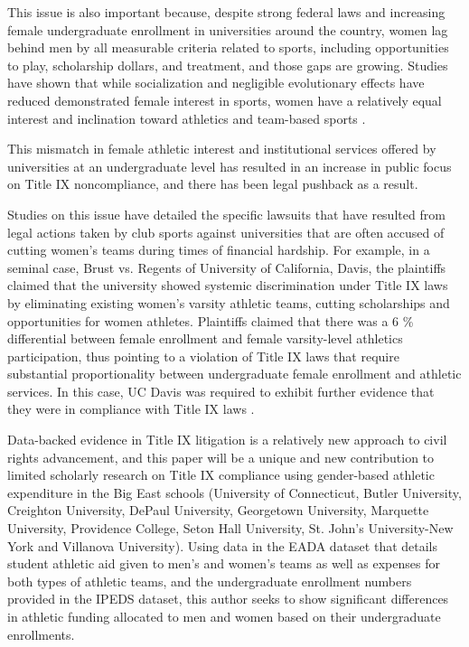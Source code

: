 \documentclass[11pt]{article}
\begin{document}
This issue is also important because, despite strong federal laws and increasing female undergraduate enrollment in universities around the country, women lag behind men by all measurable criteria related to sports, including opportunities to play, scholarship dollars, and treatment, and those gaps are growing. Studies have shown that while socialization and negligible evolutionary effects have reduced demonstrated female interest in sports, women have a relatively equal interest and inclination toward athletics and team-based sports \cite{Deaner}.

This mismatch in female athletic interest and institutional services offered by universities at an undergraduate level has resulted in an increase in public focus on Title IX noncompliance, and there has been legal pushback as a result. 

\medskip

Studies on this issue have detailed the specific lawsuits that have resulted from legal actions taken by club sports against universities that are often accused of cutting women's teams during times of financial hardship. For example, in a seminal case, Brust vs. Regents of University of California, Davis, the plaintiffs claimed that the university showed systemic discrimination under Title IX laws by eliminating existing women's varsity athletic teams, cutting scholarships and opportunities for women athletes. Plaintiffs claimed that there was a 6 \% differential between female enrollment and female varsity-level athletics participation, thus pointing to a violation of Title IX laws that require substantial proportionality between undergraduate female enrollment and athletic services. In this case, UC Davis was required to exhibit further evidence that they were in compliance with Title IX laws \cite{Brust}.

\medskip

Data-backed evidence in Title IX litigation is a relatively new approach to civil rights advancement, and this paper will be a unique and new contribution to limited scholarly research on Title IX compliance using gender-based athletic expenditure in the Big East schools (University of Connecticut, Butler University, Creighton University, DePaul University, Georgetown University, Marquette University, Providence College, Seton Hall University, St. John's University-New York and Villanova University). Using data in the EADA dataset that details student athletic aid given to men's and women's teams as well as expenses for both types of athletic teams, and the undergraduate enrollment numbers provided in the IPEDS dataset, this author seeks to show significant differences in athletic funding allocated to men and women based on their undergraduate enrollments.
\end{document}
